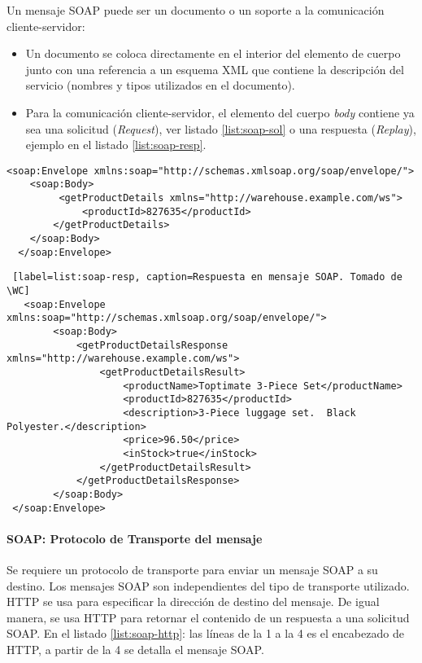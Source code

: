  	
 
 	  	 
 	 Un mensaje SOAP puede ser un documento o un soporte a la comunicación cliente-servidor:
 	\begin{itemize}
 		\item	Un documento  se coloca directamente en el interior del elemento de cuerpo  junto con una referencia a un esquema XML que contiene la descripción del servicio (nombres y tipos utilizados en el documento). 
 		\item Para la comunicación cliente-servidor, el elemento del cuerpo \textit{body} contiene ya sea una solicitud (\textit{Request}), ver listado \ref{list:soap-sol}  o una respuesta (\textit{Replay}), ejemplo en el listado \ref{list:soap-resp}.
 	\end{itemize}
 
 
 
   \begin{lstlisting}[label=list:soap-sol, caption=Solicitud en mensaje SOAP. Tomado de \WC]  <soap:Envelope xmlns:soap="http://schemas.xmlsoap.org/soap/envelope/">
  	<soap:Body>
 		 <getProductDetails xmlns="http://warehouse.example.com/ws">
 			 <productId>827635</productId>
  		</getProductDetails>
	</soap:Body>
  </soap:Envelope>
 \end{lstlisting}
 
 
 
 
 \begin{lstlisting} [label=list:soap-resp, caption=Respuesta en mensaje SOAP. Tomado de \WC]
   <soap:Envelope xmlns:soap="http://schemas.xmlsoap.org/soap/envelope/">
 		<soap:Body>
 			<getProductDetailsResponse xmlns="http://warehouse.example.com/ws">
 				<getProductDetailsResult>
 					<productName>Toptimate 3-Piece Set</productName>
					<productId>827635</productId>
 					<description>3-Piece luggage set.  Black Polyester.</description>
					<price>96.50</price>
 					<inStock>true</inStock>
 				</getProductDetailsResult>
 			</getProductDetailsResponse>
 		</soap:Body>
 </soap:Envelope>
\end{lstlisting}


 
 
   	\paragraph{SOAP: Protocolo de Transporte del mensaje} 
   	Se requiere un protocolo de transporte para enviar un mensaje SOAP
   	 a su destino. Los mensajes SOAP son independientes del tipo de transporte utilizado. HTTP  se usa para especificar la dirección de destino del mensaje. De igual manera,   se usa  HTTP  para retornar el contenido de un respuesta a una solicitud SOAP. En el listado \ref{list:soap-http}: las l\'ineas de la 1 a la 4 es el encabezado de HTTP, a partir de la 4 se detalla el mensaje SOAP. 
 
